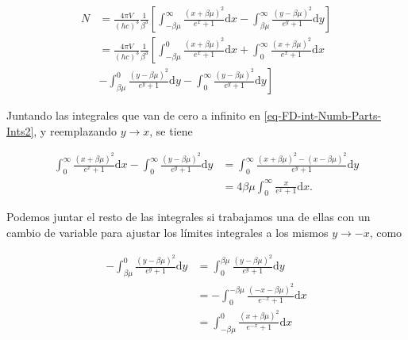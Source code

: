 \begin{equation}\label{eq-FD-int-Numb-Parts-Ints2}
\begin{split}
N &= \frac{4 \pi V}{(hc)^{3}} \frac{1}{{\beta}^{3}} \left[\int_{-\beta \mu}^{\infty} \frac{(x + \beta \mu)^{2}}{{e}^{x}+1}  \mathrm{d}x - \int_{\beta \mu}^{\infty} \frac{(y -\beta \mu)^{2}}{{e}^{y}+1}  \mathrm{d}y \right] \\
& = \frac{4 \pi V}{(hc)^{3}} \frac{1}{{\beta}^{3}} \left[ \int_{-\beta \mu}^{0} \frac{(x + \beta \mu)^{2}}{{e}^{x}+1}  \mathrm{d}x + \int_{0}^{\infty} \frac{(x + \beta \mu)^{2}}{{e}^{x}+1}\mathrm{d}x \right. \\
& \left. - \int_{\beta \mu}^{0} \frac{(y -\beta \mu)^{2}}{{e}^{y}+1}  \mathrm{d}y  - \int_{0}^{\infty} \frac{(y -\beta \mu)^{2}}{{e}^{y}+1}  \mathrm{d}y  \right]
\end{split}
\end{equation}

Juntando las integrales que van de cero a infinito en \eqref{eq-FD-int-Numb-Parts-Ints2}, y reemplazando $y \rightarrow x$, se tiene

\begin{equation}\label{eq-FD-int-Numb-Parts-IntsPart1-2}
\begin{split}
\int_{0}^{\infty} \frac{(x + \beta \mu)^{2}}{{e}^{x}+1}\mathrm{d}x - \int_{0}^{\infty} \frac{(y -\beta \mu)^{2}}{{e}^{y}+1}  \mathrm{d}y & = \int_{0}^{\infty} \frac{(x +\beta \mu)^{2} - (x -\beta \mu)^{2}}{{e}^{y}+1}  \mathrm{d}y \\
& = 4\beta \mu \int_{0}^{\infty} \frac{x}{{e}^{x} + 1} \mathrm{d} x.
\end{split}
\end{equation}

Podemos juntar el resto de las integrales si trabajamos una de ellas con un cambio de variable para ajustar los límites integrales a los mismos $y \rightarrow -x$, como

\begin{equation}
\begin{split}
- \int_{\beta \mu}^{0} \frac{(y -\beta \mu)^{2}}{{e}^{y}+1}  \mathrm{d}y & =  \int_{0}^{\beta \mu} \frac{(y -\beta \mu)^{2}}{{e}^{y}+1}  \mathrm{d}y \\
& = - \int_{0}^{-\beta \mu} \frac{(-x -\beta \mu)^{2}}{{e}^{-x}+1}  \mathrm{d}x \\
& = \int_{-\beta \mu}^{0} \frac{(x + \beta \mu)^{2}}{{e}^{-x}+1}  \mathrm{d}x
\end{split}
\end{equation}

